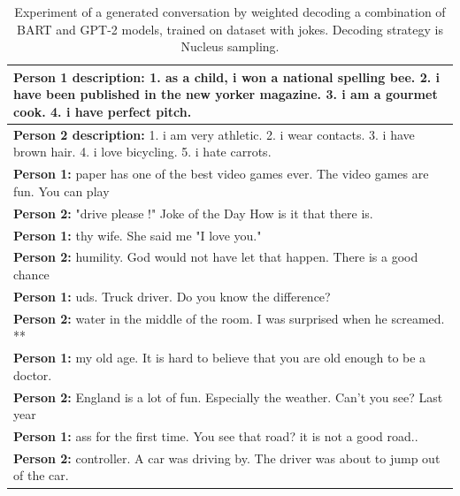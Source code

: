 \begin{table}[H]
\centering
 \begin{tabular}{|p{14cm}|} 
 \hline
 \textbf{Person 1 description:} 1. as a child, i won a national spelling bee. 2. i have been published in the new yorker magazine. 3. i am a gourmet cook. 4. i have perfect pitch. \\
 \hline
 \textbf{Person 2 description:} 1. i am very athletic. 2. i wear contacts. 3. i have brown hair. 4. i love bicycling. 5. i hate carrots. \\
 \hline
 \textbf{Person 1:} paper has one of the best video games ever. The video games are fun. You can play \\ 
 \textbf{Person 2:} "drive please !" Joke of the Day How is it that there is. \\
 \textbf{Person 1:} thy wife. She said me "I love you."  \\
 \textbf{Person 2:} humility. God would not have let that happen. There is a good chance\\
 \textbf{Person 1:} uds. Truck driver. Do you know the difference? \\
 \textbf{Person 2:} water in the middle of the room. I was surprised when he screamed. **  \\
 \textbf{Person 1:} my old age. It is hard to believe that you are old enough to be a doctor. \\
 \textbf{Person 2:} England is a lot of fun. Especially the weather. Can't you see? Last year \\
 \textbf{Person 1:} ass for the first time. You see that road? it is not a good road.. \\
 \textbf{Person 2:} controller. A car was driving by. The driver was about to jump out of the car. \\
 \hline
 \end{tabular}
 \caption{Experiment of a generated conversation by weighted decoding a combination of BART and GPT-2 models, trained on dataset with jokes. Decoding strategy is Nucleus sampling.}
\label{tab:jokes_nucleus}
\end{table}

